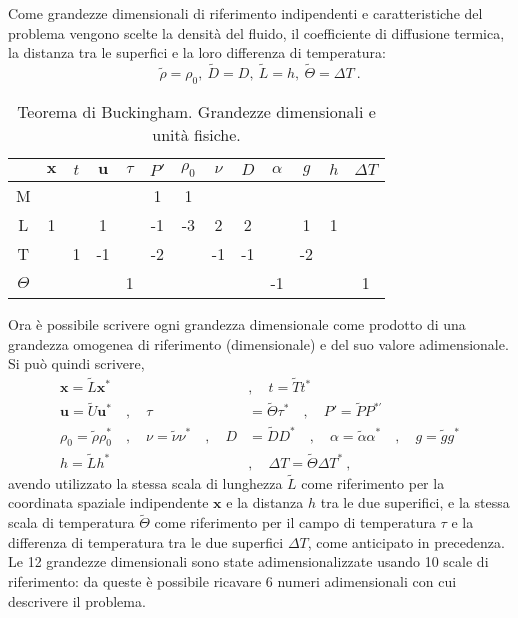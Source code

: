 \newline
Come grandezze dimensionali di riferimento indipendenti e  caratteristiche del problema vengono scelte la densità del fluido, il coefficiente di diffusione termica, la distanza tra le superfici e la loro differenza di temperatura:
\begin{equation}
    \tilde{\rho}=\rho_0, \ \tilde{D} = D, \ \tilde{L} = h, \ \tilde{\Theta} = \Delta T \ .
\end{equation}
%
\begin{table}[t]
    \centering
    \begin{tabular}{c|cc ccc ccccc cc}
    & $\bm{x}$ & $t$ & $\bm{u}$ & $\tau$ & $P'$ & $\rho_0$ & $\nu$ & $D$ & $\alpha$ & $g$ & $h$ & $\Delta T$\\ \hline
        M &   &   &   &   & 1 & 1 &   &   &   &   &   &   \\
        L & 1 &   & 1 &   &-1 &-3 & 2 & 2 &   & 1 & 1 &   \\
        T &   & 1 &-1 &   &-2 &   &-1 &-1 &   &-2 &   &   \\
 $\Theta$ &   &   &   & 1 &   &   &   &   &-1 &   &   & 1 \\
    \end{tabular}
    \caption{Teorema di Buckingham. Grandezze dimensionali e unità fisiche.}
    \label{tab:Bouss-pi-thm}
\end{table}
%
\newline
Ora è possibile scrivere ogni grandezza dimensionale come prodotto di una grandezza omogenea di riferimento (dimensionale) e del suo valore adimensionale. Si può quindi scrivere,
\begin{equation}\label{eqn:var-adim}
\begin{aligned}
    \bm{x} = \tilde{L} \bm{x}^*  \quad & , \quad t = \tilde{T} t^* \\
    \bm{u} = \tilde{U} \bm{u}^* \quad , \quad \tau & = \tilde{\Theta} \tau^* \quad , \quad P' = \tilde{P} P^{*'} \\
    \rho_0 = \tilde{\rho} \rho_0^* \quad  , \quad \nu = \tilde{\nu} \nu^* \quad , \quad D & = \tilde{D} D^* \quad , \quad \alpha = \tilde{\alpha} \alpha^* \quad , \quad g = \tilde{g} g^* \\
    h = \tilde{L} h^* \quad & , \quad \Delta T = \tilde{\Theta} \Delta T^* \ ,
\end{aligned}
\end{equation}
avendo utilizzato la stessa scala di lunghezza $\tilde{L}$ come riferimento per la coordinata spaziale indipendente $\bm{x}$ e la distanza $h$ tra le due superifici, e la stessa scala di temperatura $\tilde{\Theta}$ come riferimento per il campo di temperatura $\tau$ e la differenza di temperatura tra le due superfici $\Delta T$, come anticipato in precedenza. Le 12 grandezze dimensionali sono state adimensionalizzate usando 10 scale di riferimento: da queste è possibile ricavare 6 numeri adimensionali con cui descrivere il problema.

